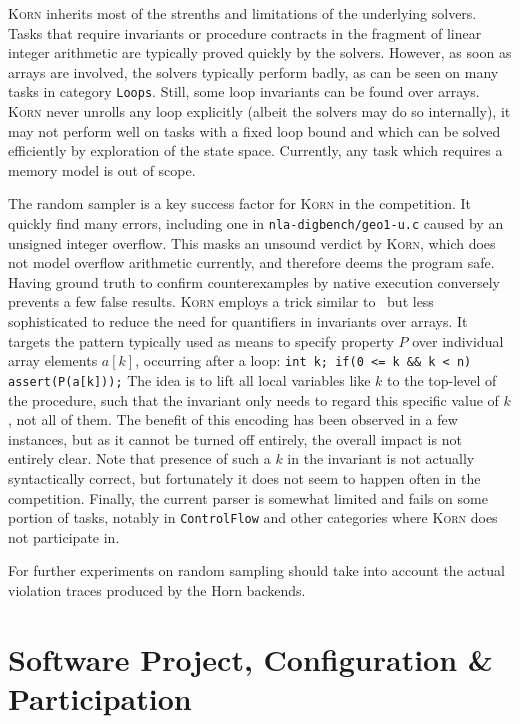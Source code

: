 \documentclass{llncs}
\newcommand{\Korn}{\textsc{Korn}\xspace}
\begin{document}
\Korn inherits most of the strenths and limitations of the underlying solvers.
Tasks that require invariants or procedure contracts in the fragment of linear integer arithmetic
are typically proved quickly by the solvers.
However, as soon as arrays are involved, the solvers typically perform badly,
as can be seen on many tasks in category \texttt{Loops}.
Still, some loop invariants can be found over arrays.
\Korn never unrolls any loop explicitly (albeit the solvers may do so internally),
it may not perform well on
tasks with a fixed loop bound and which can be solved efficiently by exploration of the state space.
Currently, any task which requires a memory model is out of scope.

The random sampler is a key success factor for \Korn in the competition.
It quickly find many errors, including one in \texttt{nla-digbench/geo1-u.c} caused by an unsigned integer overflow.
This masks an unsound verdict by \Korn, which does not model overflow arithmetic currently, and therefore deems the program safe.
Having ground truth to confirm counterexamples by native execution conversely prevents a few false results.
% 
\Korn employs a trick similar to~\cite{monniaux2016cell} but less sophisticated
to reduce the need for quantifiers in invariants over arrays.
It targets the pattern typically used as means to specify property $P$ over individual array elements $a[k]$,
occurring after a loop:
\verb|int k; if(0 <= k && k < n) assert(P(a[k]));|
The idea is to lift all local variables like $k$ to the top-level of the procedure,
such that the invariant only needs to regard this specific value of $k$, not all of them.
The benefit of this encoding has been observed in a few instances,
but as it cannot be turned off entirely, the overall impact is not entirely clear.
Note that presence of such a $k$ in the invariant is not actually syntactically correct,
but fortunately it does not seem to happen often in the competition.
Finally, the current parser is somewhat limited and fails on some portion of tasks,
notably in \texttt{ControlFlow} and other categories where \Korn does not participate in.


For further experiments on random sampling should
take into account the actual violation traces produced by the Horn backends.

\section{Software Project, Configuration \& Participation}
\label{sec:project}
\end{document}
